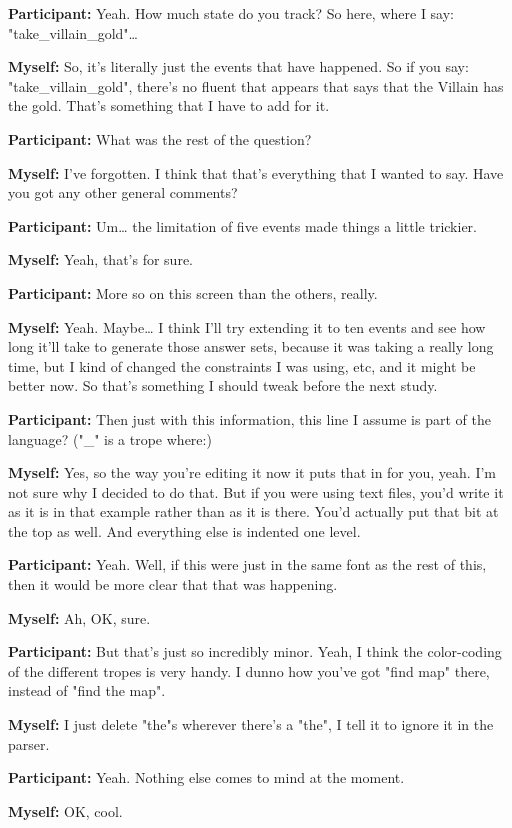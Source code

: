 \documentclass[11pt]{report}
\begin{document}
\begin{linenumbers}
\textbf{Participant:} Yeah. How much state do you track? So here, where I say: "take_villain_gold"\ldots{}

\textbf{Myself:} So, it's literally just the events that have happened. So if you say: "take_villain_gold", there's no fluent that appears that says that the Villain has the gold. That's something that I have to add for it.

\textbf{Participant:} What was the rest of the question?

\textbf{Myself:} I've forgotten. I think that that's everything that I wanted to say. Have you got any other general comments?

\textbf{Participant:} Um\ldots{} the limitation of five events made things a
little trickier.

\textbf{Myself:} Yeah, that's for sure.

\textbf{Participant:} More so on this screen than the others, really.

\textbf{Myself:} Yeah. Maybe\ldots{} I think I'll try extending it to ten events and see how long it'll take to generate those answer sets, because it was taking a really long time, but I kind of changed the constraints I was using, etc, and it might be better now. So that's something I should tweak before the next study.

\textbf{Participant:} Then just with this information, this line I assume is part of the language? ("\_" is a trope where:)

\textbf{Myself:} Yes, so the way you're editing it now it puts that in for you, yeah. I'm not sure why I decided to do that. But if you were using text files, you'd write it as it is in that example rather than as it is there. You'd actually put that bit at the top as well. And everything else is indented one level.

\textbf{Participant:} Yeah. Well, if this were just in the same font as the rest of this, then it would be more clear that that was happening.

\textbf{Myself:} Ah, OK, sure.

\textbf{Participant:} But that's just so incredibly minor. Yeah, I think the
color-coding of the different tropes is very handy. I dunno how you've got "find
map" there, instead of "find the map".

\textbf{Myself:} I just delete "the"s wherever there's a "the", I tell it to ignore it in the parser.

\textbf{Participant:} Yeah. Nothing else comes to mind at the moment.

\textbf{Myself:} OK, cool.

\end{linenumbers}
\resetlinenumber[1]




\end{document}

